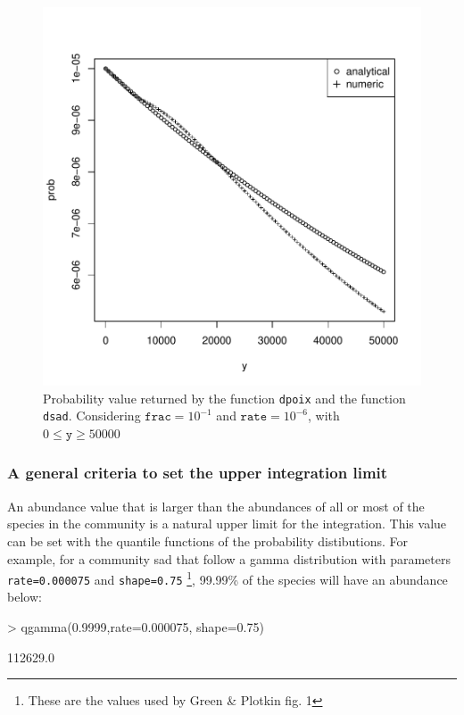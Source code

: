 \documentclass{article}
\newcommand{\code}[1]{\texttt{#1}}
\begin{document}
\begin{figure}[ht]
  \begin{center}
\includegraphics{sads_tutorial-013}
\end{center}
\caption{Probability value returned by the function \code{dpoix} and the function \code{dsad}. Considering $\code{frac}=10^{-1}$ and $\code{rate}=10^{-6}$, with $0 \leq \code{y} \geq 50000$}
\label{fig:bad}
\end{figure}

\subsubsection*{A general criteria to set the upper integration limit}
An abundance value that is larger than the abundances of all or most of the  species in the community is a natural upper limit for the integration. This value can be set with the quantile functions of the probability distibutions. For example, for a community sad that follow a gamma distribution with parameters \code{rate=0.000075} and \code{shape=0.75} \footnote{These are the values used by Green \& Plotkin fig. 1}, 99.99\% of the species will have an abundance below:

\begin{Schunk}
\begin{Sinput}
> qgamma(0.9999,rate=0.000075, shape=0.75)
\end{Sinput}
\begin{Soutput}
[1] 112629.0
\end{Soutput}
\end{Schunk}
\end{document}
